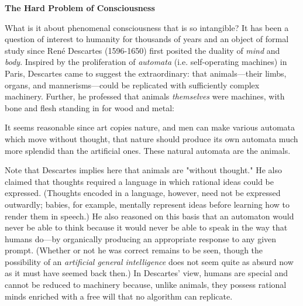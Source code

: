 \begin{tcolorbox}[breakable, enhanced, colback=textbook-blue, sharp corners]
	\vspace{3mm}
	\begin{center}
		\textbf{The Hard Problem of Consciousness}
	\end{center}
	What is it about phenomenal consciousness that is so intangible? It has been a question of interest to humanity for thousands of years and an object of formal study since Ren\'e Descartes (1596-1650) first posited the duality of \textit{mind} and \textit{body}. Inspired by the proliferation of \textit{automata} (i.e. self-operating machines) in Paris, Descartes came to suggest the extraordinary: that animals---their limbs, organs, and mannerisms---could be replicated with sufficiently complex machinery. Further, he professed that animals \textit{themselves} were machines, with bone and flesh standing in for wood and metal: \\
	
	\begin{displayquote}
		It seems reasonable since art copies nature, and men can make various automata which move without thought, that nature should produce its own automata much more splendid than the artificial ones. These natural automata are the animals. \\
	\end{displayquote}
	
	Note that Descartes implies here that animals are "without thought." He also claimed that thoughts required a language in which rational ideas could be expressed. (Thoughts encoded in a language, however, need not be expressed outwardly; babies, for example, mentally represent ideas before learning how to render them in speech.) He also reasoned on this basis that an automaton would never be able to think because it would never be able to speak in the way that humans do---by organically producing an appropriate response to any given prompt. (Whether or not he was correct remains to be seen, though the possibility of an \textit{artificial general intelligence} does not seem quite as absurd now as it must have seemed back then.) In Descartes' view, humans are special and cannot be reduced to machinery because, unlike animals, they possess rational minds enriched with a free will that no algorithm can replicate. \\
	

\end{tcolorbox}

